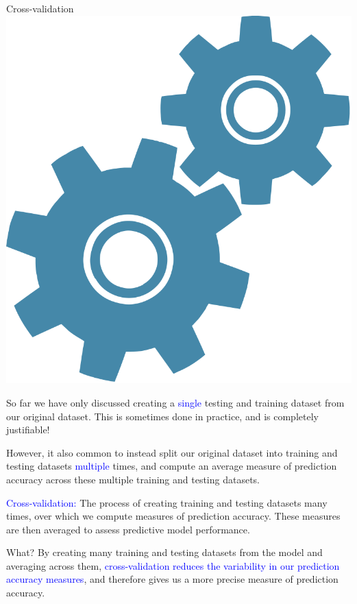 \documentclass[10pt,t]{beamer}
\begin{document}
\begin{frame}{Cross-validation \includegraphics[scale=0.01]{figures/technical.png} }
	\vspace{-5 mm}
	
	So far we have only discussed creating a  \textcolor{blue}{single} testing and training dataset from our original dataset. This is sometimes done in practice, and is completely justifiable! 
	
		\vspace{0.3cm}
	
	However, it also common to instead split our original dataset into training and testing datasets  \textcolor{blue}{multiple} times, and compute an average measure of prediction accuracy across these multiple training and testing datasets.
	
	\vspace{0.3cm}
	
	\textcolor{blue}{Cross-validation:} The process of creating training and testing datasets many times, over which we compute measures of prediction accuracy. These measures are then averaged to assess predictive model performance.
	
	\vspace{0.3cm}
	
	What? By creating many training and testing datasets from the model and averaging across them, \textcolor{blue}{cross-validation reduces the variability in our prediction accuracy measures}, and therefore gives us a more precise measure of prediction accuracy.
	
\end{frame}
\end{document}

